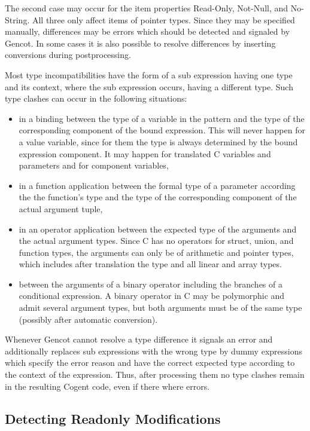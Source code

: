 The second case may occur for the item properties Read-Only, Not-Null, and No-String. All three only affect items of pointer
types. Since they may be specified manually, differences may be errors which should be detected and signaled by Gencot. In some
cases it is also possible to resolve differences by inserting conversions during postprocessing.

Most type incompatibilities have the form of a sub expression having one type and its context, where the sub expression occurs,
having a different type. Such type clashes can occur in the following situations:
\begin{itemize}
\item in a binding between the type of a variable in the pattern and the type of the corresponding component of the bound
expression. This will never happen for a value variable, since for them the type is always determined by the bound expression
component. It may happen for translated C variables and parameters and for component variables,
\item in a function application between the formal type of a parameter according the the function's type and the type of
the corresponding component of the actual argument tuple,
\item in an operator application between the expected type of the arguments and the actual argument types. Since C has no operators
for struct, union, and function types, the arguments can only be of arithmetic and pointer types, which includes after
translation the type  and all linear and array types.
\item between the arguments of a binary operator including the branches of a conditional expression. A binary operator in C
may be polymorphic and admit several argument types, but both arguments must be of the same type (possibly after automatic
conversion).
\end{itemize}

Whenever Gencot cannot resolve a type difference it signals an error and additionally replaces sub expressions with the wrong type
by dummy expressions which specify the error reason and have the correct expected type according to the context of the expression.
Thus, after processing them no type clashes remain in the resulting Cogent code, even if there where errors.

\subsection{Detecting Readonly Modifications}
\label{impl-post-romod}

